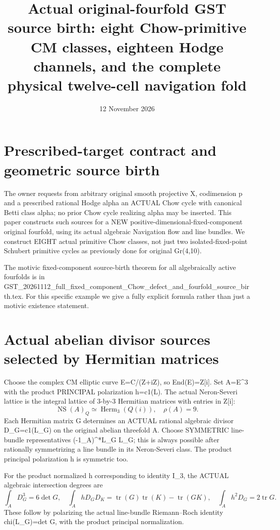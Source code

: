 \documentclass[11pt]{article}
\title{Actual original-fourfold GST source birth: eight Chow-primitive CM classes, eighteen Hodge channels, and the complete physical twelve-cell navigation fold}
\date{12 November 2026}
\begin{document}
\maketitle

\section{Prescribed-target contract and geometric source birth}
The owner requests from arbitrary original smooth projective X,
codimension p and a prescribed rational Hodge alpha an ACTUAL Chow
cycle with canonical Betti class alpha; no prior Chow cycle realizing
alpha may be inserted. This paper constructs such sources for
a NEW positive-dimensional-fixed-component original fourfold,
using its actual algebraic Navigation flow and line bundles.
We construct EIGHT actual primitive Chow classes, not just two
isolated-fixed-point Schubert primitive cycles as previously done
for original Gr(4,10).

The motivic fixed-component source-birth theorem for all algebraically
active fourfolds is in
GST_20261112_full_fixed_component_Chow_defect_and_fourfold_source_birth.tex.
For this specific example we give a fully explicit formula
rather than just a motivic existence statement.

\section{Actual abelian divisor sources selected by Hermitian matrices}
Choose the complex CM elliptic curve
E=C/(Z+iZ), so End(E)=Z[i]. Set A=E^3 with the
product PRINCIPAL polarization h=c1(L). The actual
Neron-Severi lattice is the integral lattice of
3-by-3 Hermitian matrices with entries in Z[i]:
\[
\operatorname{NS}(A)_Q\simeq\operatorname{Herm}_3(Q(i)),
\quad\rho(A)=9.
\]
Each Hermitian matrix G determines an ACTUAL rational algebraic
divisor D_G=c1(L_G) on the original abelian threefold A.
Choose SYMMETRIC line-bundle representatives
(-1_A)^*L_G \cong L_G; this is always possible after
rationally symmetrizing a line bundle in its Neron-Severi class.
The product principal polarization h is symmetric too.

For the product normalized h corresponding to identity I_3,
the ACTUAL algebraic intersection degrees are
\[
\boxed{
\int_A D_G^3=6\det G,\quad
\int_A hD_GD_K=\operatorname{tr}(G)\operatorname{tr}(K)
-\operatorname{tr}(GK),\quad
\int_A h^2D_G=2\operatorname{tr}G.}
\tag{1}
\]
These follow by polarizing the actual line-bundle Riemann--Roch
identity chi(L_G)=det G, with the product principal normalization.
\end{document}
